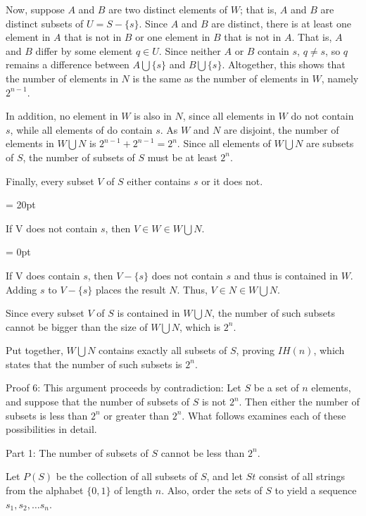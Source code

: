 Now, suppose $A$ and $B$ are two distinct elements of $W$; that is, $A$ and $B$ are distinct subsets of $U = S - \{s\}$.  Since $A$ and $B$ are distinct, there is at least one element in $A$ that is not in $B$ or one element in $B$ that is not in $A$.  That is, $A$ and $B$ differ by some element $q \in U$.  Since neither $A$ or $B$ contain $s$, $q \ne s$, so $q$ remains a difference between $A \bigcup \{s\}$ and $B \bigcup \{s\}$.  Altogether, this shows that the number of elements in $N$ is the same as the number of elements in $W$, namely $2^{n-1}$.

In addition, no element in $W$ is also in $N$, since all elements in $W$ do not contain $s$, while all elements of do contain $s$.  As $W$ and $N$ are disjoint, the number of elements in $W \bigcup N$ is $2^{n-1} + 2^{n-1} = 2^n$.  Since all elements of $W \bigcup N$ are subsets of $S$, the number of subsets of $S$ must be at least $2^n$.

Finally, every subset $V$ of $S$ either contains $s$ or it does not.  

{\parindent = 20pt

\item {} If V does not contain $s$, then $V \in W \in W \bigcup N$.

\parskip = 0pt

\item {} If V does contain $s$, then $V-\{s\}$ does not contain $s$ and thus is contained in $W$.  Adding $s$ to $V-\{s\}$ places the result $N$.  Thus, $V \in N  \in W \bigcup N$.

}

Since every subset $V$ of $S$ is contained in $W \bigcup N$, the number of such subsets cannot be bigger than the size of $W \bigcup N$, which is $2^n$.  

Put together, $W \bigcup N$ contains exactly all subsets of $S$, proving $IH(n)$, which states that the number of such subsets is $2^n$.

\vfill\eject
{\bold Proof 6:}  This argument proceeds by contradiction:\hfil\break
Let $S$ be a set of $n$ elements, and suppose that the number of subsets of $S$ is not $2^n$.  Then either the number of subsets is less than $2^n$ or greater than $2^n$.  What follows examines each of these possibilities in detail.

{\ital Part 1:  The number of subsets of $S$ cannot be less than $2^n$.}

Let $P(S)$ be the collection of all subsets of $S$, and \hfil\break
let $St$ consist of all strings from the alphabet $\{0, 1\}$ of length $n$.\hfil\break  
Also, order the sets of $S$ to yield a sequence $s_1, s_2, \dots s_n$.

